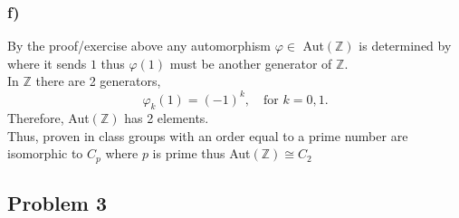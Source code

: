 \documentclass[12pt, letterpaper]{article}
\theoremstyle{definition}
\newcommand{\Z}{\mathbb{Z}}
\begin{document}
\subsubsection*{f)}
By the proof/exercise above any automorphism $\varphi \in $ Aut$(\Z)$ is determined by where it sends $1$ thus $\varphi(1)$ must be another generator of $\Z$.\\
In $\Z$ there are 2 generators,\\
\[
\varphi_k(1)=(-1)^k, \quad \text{for $k = 0,1$.}
\]
Therefore, Aut$(\Z)$ has 2 elements.\\
Thus, proven in class groups with an order equal to a prime number are isomorphic to $C_p$ where $p$ is prime thus Aut$(\Z) \cong C_2$

\newpage
\subsection*{Problem 3}
\end{document}
